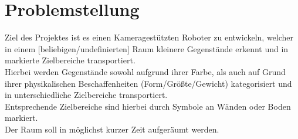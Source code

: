 \chapter{Problemstellung}
\label{cha:Problemstellung}

Ziel des Projektes ist es einen Kameragestützten Roboter zu entwickeln, welcher in einem [beliebigen/undefinierten] Raum kleinere Gegenstände erkennt und in markierte Zielbereiche transportiert.\\
Hierbei werden Gegenstände sowohl aufgrund ihrer Farbe, als auch auf Grund ihrer physikalischen Beschaffenheiten (Form/Größte/Gewicht) kategorisiert und in unterschiedliche Zielbereiche transportiert.\\
Entsprechende Zielbereiche sind hierbei durch Symbole an Wänden oder Boden markiert.\\
Der Raum soll in möglichst kurzer Zeit aufgeräumt werden.